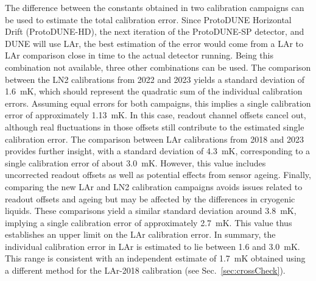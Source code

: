 \noindent The difference between the constants obtained in two calibration campaigns can be used to estimate the total calibration error. Since ProtoDUNE Horizontal Drift (ProtoDUNE-HD), the next iteration of the ProtoDUNE-SP detector, and DUNE will use LAr, the best estimation of the error would come from a LAr to LAr comparison close in time to the actual detector running. Being this combination not available, three other combinations can be used. The comparison between the LN2 calibrations from 2022 and 2023 yields a standard deviation of 1.6~mK, which should represent the quadratic sum of the individual calibration errors. Assuming equal errors for both campaigns, this implies a single calibration error of approximately 1.13~mK. In this case, readout channel offsets cancel out, although real fluctuations in those offsets still contribute to the estimated single calibration error. The comparison between LAr calibrations from 2018 and 2023 provides further insight, with a standard deviation of 4.3~mK, corresponding to a single calibration error of about 3.0~mK. However, this value includes uncorrected readout offsets as well as potential effects from sensor ageing. Finally, comparing the new LAr and LN2 calibration campaigns avoids issues related to readout offsets and ageing but may be affected by the differences in cryogenic liquids. These comparisons yield a similar standard deviation around 3.8~mK, implying a single calibration error of approximately 2.7~mK. This value thus establishes an upper limit on the LAr calibration error. In summary, the individual calibration error in LAr is estimated to lie between 1.6 and 3.0~mK. This range is consistent with an independent estimate of 1.7~mK obtained using a different method for the LAr-2018 calibration (see Sec.~\ref{sec:crossCheck}).


